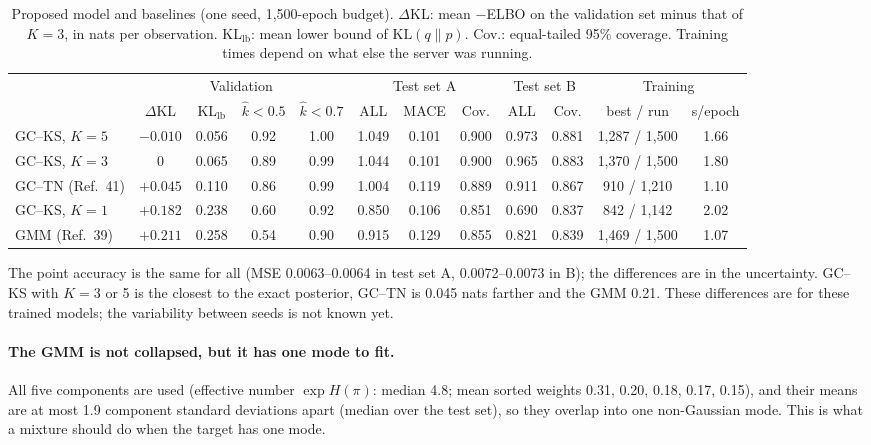 \documentclass[11pt]{article}
\begin{document}
\begin{table}[t]
\centering\footnotesize
\setlength{\tabcolsep}{3.4pt}
\caption{Proposed model and baselines (one seed, 1,500-epoch budget). $\Delta$KL: mean $-$ELBO on the validation set
minus that of $K=3$, in nats per observation. KL$_{\mathrm{lb}}$: mean lower bound of $\mathrm{KL}(q\|p)$. Cov.: equal-tailed
95\% coverage. Training times depend on what else the server was running.}
\label{tab:baselines}
\begin{tabular}{l cc cc ccc cc cc}
\toprule
 & \multicolumn{4}{c}{Validation} & \multicolumn{3}{c}{Test set A} & \multicolumn{2}{c}{Test set B} & \multicolumn{2}{c}{Training} \\
\cmidrule(lr){2-5}\cmidrule(lr){6-8}\cmidrule(lr){9-10}\cmidrule(lr){11-12}
 & $\Delta$KL & KL$_{\mathrm{lb}}$ & $\hat k<0.5$ & $\hat k<0.7$ & ALL & MACE & Cov. & ALL & Cov. & best / run & s/epoch \\
\midrule
GC--KS, $K=5$    & $-0.010$ & 0.056 & 0.92 & 1.00 & 1.049 & 0.101 & 0.900 & 0.973 & 0.881 & 1,287 / 1,500 & 1.66 \\
GC--KS, $K=3$    & 0        & 0.065 & 0.89 & 0.99 & 1.044 & 0.101 & 0.900 & 0.965 & 0.883 & 1,370 / 1,500 & 1.80 \\
GC--TN (Ref.~41) & $+0.045$ & 0.110 & 0.86 & 0.99 & 1.004 & 0.119 & 0.889 & 0.911 & 0.867 & 910 / 1,210   & 1.10 \\
GC--KS, $K=1$    & $+0.182$ & 0.238 & 0.60 & 0.92 & 0.850 & 0.106 & 0.851 & 0.690 & 0.837 & 842 / 1,142   & 2.02 \\
GMM (Ref.~39)    & $+0.211$ & 0.258 & 0.54 & 0.90 & 0.915 & 0.129 & 0.855 & 0.821 & 0.839 & 1,469 / 1,500 & 1.07 \\
\bottomrule
\end{tabular}
\end{table}

The point accuracy is the same for all (MSE 0.0063--0.0064 in test set A, 0.0072--0.0073 in B); the differences are in
the uncertainty. GC--KS with $K=3$ or 5 is the closest to the exact posterior, GC--TN is 0.045 nats farther and the
GMM 0.21. These differences are for these trained models; the variability between seeds is not known yet.

\paragraph{The GMM is not collapsed, but it has one mode to fit.} All five components are used (effective number
$\exp H(\pi)$: median 4.8; mean sorted weights 0.31, 0.20, 0.18, 0.17, 0.15), and their means are at most 1.9 component
standard deviations apart (median over the test set), so they overlap into one non-Gaussian mode. This is what a mixture
should do when the target has one mode.
\end{document}
